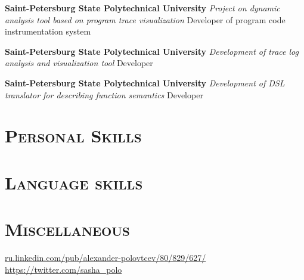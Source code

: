 \documentclass[12pt,a4paper]{moderncv}
\begin{document}
{\textbf{Saint-Petersburg State Polytechnical University}\newline
 \textit{Project on dynamic analysis tool based on program trace visualization}
 \newline Developer of program code instrumentation system}

{\textbf{Saint-Petersburg State Polytechnical University}\newline
 \textit{Development of trace log analysis and visualization tool}
 \newline Developer}

{\textbf{Saint-Petersburg State Polytechnical University}\newline
 \textit{Development of DSL translator for describing function semantics}
 \newline Developer}


\section{\textsc{Personal Skills}}
%
%
%
%


\section{\textsc{Language skills}}
%


\section{\textsc{Miscellaneous}}
%
       {{\color{see}\url{ru.linkedin.com/pub/alexander-polovtcev/80/829/627/}}}
       {{\color{see}\url{https://twitter.com/sasha_polo}}}
\end{document}
